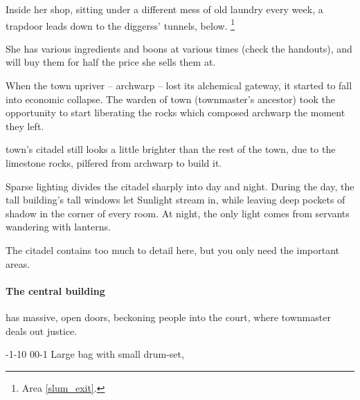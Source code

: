 \begin{multicols}{2}
Inside her shop, sitting under a different mess of old laundry every week, a trapdoor leads down to the \glspl{diggers}' tunnels, below.%
\footnote{Area \vref{slum_exit}.}

She has various \glspl{ingredient} and \glspl{boon} at various times (check the handouts), and will buy them for half the price she sells them at.



\begin{exampletext}
  When the town upriver -- \gls{archwarp} -- lost its alchemical gateway, it started to fall into economic collapse.
  The \gls{warden} of \gls{town} (\gls{townmaster}'s ancestor) took the opportunity to start liberating the rocks which composed \gls{archwarp} the moment they left.

  \Gls{town}'s citadel still looks a little brighter than the rest of the town, due to the limestone rocks, pilfered from \gls{archwarp} to build it.
\end{exampletext}

Sparse lighting divides the citadel sharply into day and night.
During the day, the tall building's tall windows let Sunlight stream in, while leaving deep pockets of shadow in the corner of every room.
At night, the only light comes from servants wandering with lanterns.

The citadel contains too much to detail here, but you only need the important areas.

\paragraph{The central building}
has massive, open doors, beckoning people into the \gls{court}, where \gls{townmaster} deals out justice.

\townmaster

%
  {{-1}{-1}{0}}%
  {{0}{0}{-1}}%
  {
  }%
  {}%
  {Large bag with small drum-set, \lootJewellery}%
  {}%


\end{multicols}
